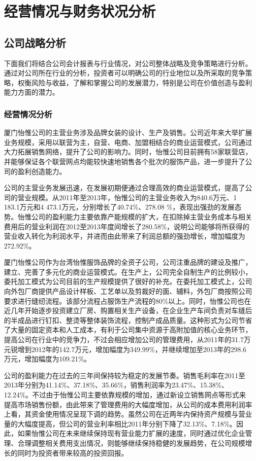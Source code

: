 
\chapter{经营情况与财务状况分析}
\label{chap02}

\section{公司战略分析}

下面我们将结合公司会计报表与行业情况，对公司整体战略及竞争策略进行分析。通过对公司所在行业的分析，投资者可以明确公司的行业地位以及所采取的竞争策略，权衡风险与收益，了解和掌握公司的发展潜力，特别是公司在价值创造与盈利能力方面的潜力。

\subsection{经营情况分析}
厦门怡惟公司的主营业务涉及品牌女装的设计、生产及销售。公司近年来大举扩展业务规模，采用以联营为主，自营、电商、加盟相结合的商业运营模式，公司通过大力拓展销售网络，提升了公司的影响力。同时，怡惟公司目前拥有58家联营店，并能够保证各个联营网点均能较快速地销售各个批次的服饰产品，进一步提升了公司的盈利创造能力。
\begin{compactenum}[(1) ]
\item 公司的主营业务发展迅速，在发展初期便通过合理高效的商业运营模式，提高了公司的营业规模。从2011年至2013年，怡惟公司的主营业务收入为840.6万元、1 183.1万元和4 473.1万元，分别增长了40.74\%、278.08
\%，表现出强劲的发展态势。怡惟公司的盈利能力主要依靠产能规模的扩大，在扣除掉主营业务成本与相关费用后的营业利润在2012至2013年度间增长了280.58\%，说明公司能够将所获得的营业收入转化为利润水平，并进而由此带来了利润总额的强劲增长，增加幅度为272.92\%。
\item 厦门怡惟公司作为台湾怡惟服饰品牌的全资子公司，公司注重品牌的建设及推广，建立、完善了多元化的商业运营模式。在生产上，公司完全自制生产的比例较小，委托加工模式为公司目前的生产规模提供了很好的补充。在委托加工模式上，公司向外包厂商提供产品设计样板、工艺单以及剪裁好的面、辅料，外包厂商按照公司要求进行缝纫流程。该部分流程占服饰生产流程的80\%以上。同时，怡惟公司也在近几年开始逐步投资建立厂房、购置相关生产设备，在企业生产车间负责对车缝后的半成品进行钉扣、整烫等整体装饰流程，控制产成品质量。这种形式为公司节省了大量的固定资本和人工成本，有利于公司集中资源于高附加值的核心业务环节，提高公司在行业中的竞争力，不过会相应增加公司的管理费用，从2011年的31.7万元锐增到2012年的142.7万元，增加幅度为349.99\%，并继续增加至2013年的298.6万元，增加幅度为109.21\%。
\item 公司的盈利能力在过去的三年间保持较为稳定的发展节奏。销售毛利率在2011至2013年分别为41.14\%、37.18\%、35.66\%，销售利润率为23.47\%、15.38\%、12.24\%。不过由于怡惟公司主要依靠规模的增加，通过新设立销售网点等形式来提高市场销售份额，由此带来了管理费用的大幅度增加，从公司的成本费用利润率上看，其资金使用情况呈现下调的趋势。虽然公司在近两年内保持资产规模与营业量的大幅度提高，但公司的营业利率相比2011年分别下降了32.13\%、7.18\%。因此，如果怡惟公司在未来继续保持现有营业能力扩展的速度，同时通过优化企业管理、合理调整相关费用支出情况，则能够继续保持稳健的发展趋势，在公司规模增长的同时为投资者带来较高的投资回报。 
\end{compactenum}


